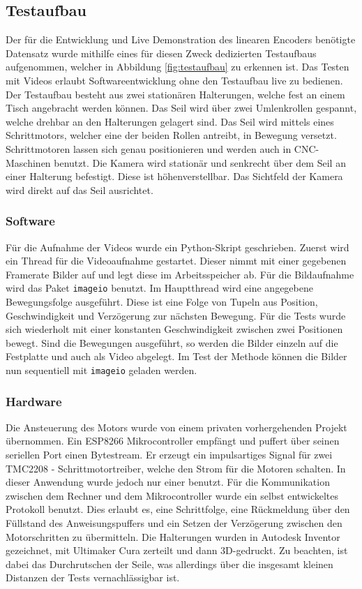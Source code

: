\documentclass[10pt,a4paper]{scrarticle}
\begin{document}
	\subsection{Testaufbau}
	Der für die Entwicklung und Live Demonstration des linearen Encoders benötigte Datensatz wurde mithilfe eines für diesen Zweck dedizierten Testaufbaus aufgenommen, welcher in Abbildung \ref{fig:testaufbau} zu erkennen ist. Das Testen mit Videos erlaubt Softwareentwicklung ohne den Testaufbau live zu bedienen. Der Testaufbau besteht aus zwei stationären Halterungen, welche fest an einem Tisch angebracht werden können. Das Seil wird über zwei Umlenkrollen gespannt, welche drehbar an den Halterungen gelagert sind. Das Seil wird mittels eines Schrittmotors, welcher eine der beiden Rollen antreibt, in Bewegung versetzt. Schrittmotoren lassen sich genau positionieren und werden auch in CNC-Maschinen benutzt. Die Kamera wird stationär und senkrecht über dem Seil an einer Halterung befestigt. Diese ist höhenverstellbar. Das Sichtfeld der Kamera wird direkt auf das Seil ausrichtet.
	


	
	\subsubsection{Software}
	Für die Aufnahme der Videos wurde ein Python-Skript geschrieben. 
	Zuerst wird ein Thread für die Videoaufnahme gestartet. Dieser nimmt mit einer gegebenen Framerate Bilder auf und legt diese im Arbeitsspeicher ab. Für die Bildaufnahme wird das Paket \texttt{imageio} benutzt. Im Hauptthread wird eine angegebene Bewegungsfolge ausgeführt. Diese ist eine Folge von Tupeln aus Position, Geschwindigkeit und Verzögerung zur nächsten Bewegung. Für die Tests wurde sich wiederholt mit einer konstanten Geschwindigkeit zwischen zwei Positionen bewegt. Sind die Bewegungen ausgeführt, so werden die Bilder einzeln auf die Festplatte und auch als Video abgelegt. Im Test der Methode können die Bilder nun sequentiell mit \texttt{imageio} geladen werden.
	
	\subsubsection{Hardware}
    Die Ansteuerung des Motors wurde von einem privaten vorhergehenden Projekt übernommen. Ein ESP8266 Mikrocontroller empfängt und puffert über seinen seriellen Port einen Bytestream. Er erzeugt ein impulsartiges Signal für zwei TMC2208 - Schrittmotortreiber, welche den Strom für die Motoren schalten. In dieser Anwendung wurde jedoch nur einer benutzt. Für die Kommunikation zwischen dem Rechner und dem Mikrocontroller wurde ein selbst entwickeltes Protokoll benutzt. Dies erlaubt es, eine Schrittfolge, eine Rückmeldung über den Füllstand des Anweisungspuffers und ein Setzen der Verzögerung zwischen den Motorschritten zu übermitteln.
    Die Halterungen wurden in Autodesk Inventor gezeichnet, mit Ultimaker Cura zerteilt und dann 3D-gedruckt. Zu beachten, ist dabei das Durchrutschen der Seile, was allerdings über die insgesamt kleinen Distanzen der Tests vernachlässigbar ist.
    
\end{document}
